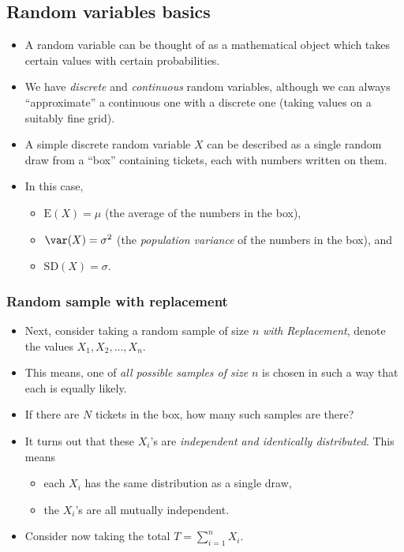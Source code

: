 \documentclass[a4paper]{article}
\begin{document}
\subsection{Random variables basics}
\begin{itemize}
	\item A random variable can be thought of as a mathematical object which takes certain values with certain probabilities.
	\item We have \textit{discrete} and \textit{continuous} random variables, although we can always ``approximate'' a continuous one with a discrete one (taking values on a suitably fine grid).
	\item A simple discrete random variable \( X \) can be described as a single random draw from a ``box'' containing tickets, each with numbers written on them.
	\item In this case,
	\begin{itemize}
		\item \( \mathrm{\mathrm{E}}(X) = \mu \) (the average of the numbers in the box),
		\item \( \var (X) = \sigma^2 \) (the \textit{population variance} of the numbers in the box), and
		\item \( \mathrm{SD} (X) = \sigma \).
	\end{itemize}
\end{itemize}
\subsubsection{Random sample with replacement}
\begin{itemize}
	\item Next, consider taking a random sample of size \( n \) \textit{with Replacement}, denote the values \( X_1,X_2,\dotsc,X_n \).
	\item This means, one of \textit{all possible samples of size} \( n \) is chosen in such a way that each is equally likely.
	\item If there are \( N \) tickets in the box, how many such samples are there?
	\item It turns out that these \( X_i \)'s are \textit{independent and identically distributed}. This means
	\begin{itemize}
		\item each \( X_i \) has the same distribution as a single draw,
		\item the \( X_i \)'s are all mutually independent.
	\end{itemize}
	\item Consider now taking the total \( T = \sum_{i=1}^{n} X_i \).
\end{itemize}
\end{document}
